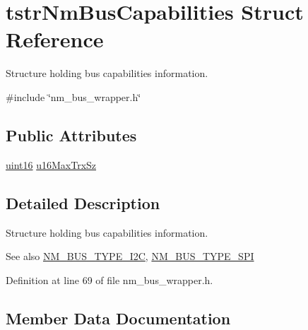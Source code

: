 \hypertarget{structtstrNmBusCapabilities}{}\section{tstr\+Nm\+Bus\+Capabilities Struct Reference}
\label{structtstrNmBusCapabilities}


Structure holding bus capabilities information.  




{\ttfamily \#include \char`\"{}nm\+\_\+bus\+\_\+wrapper.\+h\char`\"{}}

\subsection*{Public Attributes}
\begin{DoxyCompactItemize}
\item 
\hyperlink{group__DataT_ga1daa745171fc6e31d942c161422a76f9}{uint16} \hyperlink{structtstrNmBusCapabilities_ac429d0704e0ed56dde1312828ebd7e15}{u16\+Max\+Trx\+Sz}
\end{DoxyCompactItemize}


\subsection{Detailed Description}
Structure holding bus capabilities information. 

\begin{DoxySeeAlso}{See also}
\hyperlink{nm__bus__wrapper_8h_a74c7bf28af2130c00e41d8b32a95f7cb}{N\+M\+\_\+\+B\+U\+S\+\_\+\+T\+Y\+P\+E\+\_\+\+I2C}, \hyperlink{nm__bus__wrapper_8h_a669d705177e218ad3ccc8d0ad1130a4a}{N\+M\+\_\+\+B\+U\+S\+\_\+\+T\+Y\+P\+E\+\_\+\+S\+PI} 
\end{DoxySeeAlso}


Definition at line 69 of file nm\+\_\+bus\+\_\+wrapper.\+h.



\subsection{Member Data Documentation}
\mbox{\label{structtstrNmBusCapabilities_ac429d0704e0ed56dde1312828ebd7e15}} 
